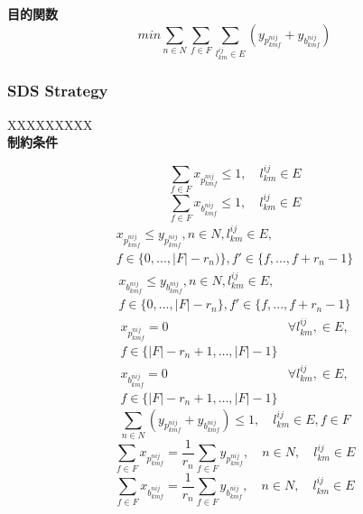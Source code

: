 \documentclass[a4j,twocolumn,fleqn]{jarticle}
\begin{document}
{\large \bf 目的関数}
\begin{equation}%
min \sum_{n \in N} \sum_{f \in F} \sum_{l^{ij}_{km} \in E}(y_{p^{nij}_{kmf}} + y_{b^{nij}_{kmf}})
\end{equation}

\subsubsection{SDS Strategy}
XXXXXXXXX\\
{\large \bf 制約条件}

\begin{equation}%
\sum_{f \in F}x_{p^{nij}_{kmf}} \leq 1,\quad l^{ij}_{km} \in E
\end{equation}
\begin{equation}%
\sum_{f \in F}x_{b^{nij}_{kmf}} \leq 1,\quad l^{ij}_{km}\in E
\end{equation}
\begin{eqnarray}%
x_{p^{nij}_{kmf}} \leq y_{p^{nij}_{kmf}}, n \in N, l^{ij}_{km} \in E, \nonumber\\
f \in \{0, ... , |F|-r_n)\},f' \in \{f, ... ,f +r_n -1\}
\end{eqnarray}
\begin{eqnarray}%
x_{b^{nij}_{kmf}} \leq y_{b^{nij}_{kmf}}, n \in N, l^{ij}_{km} \in E, \nonumber \\
f \in \{0, ... , |F|-r_n\},f' \in \{f, ... ,f + r_n -1\}
\end{eqnarray}
\begin{eqnarray}%
x_{p^{nij}_{kmf}} = 0 & \forall l^{ij}_{km},\in E, \nonumber\\
f \in \{|F| - r_n+1, \dots ,|F|-1\}
\end{eqnarray}
\begin{eqnarray}%
x_{b^{nij}_{kmf}} = 0 & \forall l^{ij}_{km},\in E,\nonumber\\ 
f \in \{|F| - r_n+1, \dots ,|F|-1\}
\end{eqnarray}
\begin{equation}%
\sum_{n \in N} (y_{p^{nij}_{kmf}} + y_{b^{nij}_{kmf}}) \leq 1,\quad l^{ij}_{km} \in E, f \in F
\end{equation}
\begin{equation}%
\sum_{f \in F}x_{p^{nij}_{kmf}} = \frac{1}{r_n}\sum_{f\in F}y_{p^{nij}_{kmf}},\quad n \in N,\quad l^{ij}_{km} \in E
\end{equation}
\begin{equation}%
\sum_{f \in F}x_{b^{nij}_{kmf}} = \frac{1}{r_n}\sum_{f\in F}y_{b^{nij}_{kmf}},\quad n \in N,\quad l^{ij}_{km} \in E
\end{equation}
\end{document}
